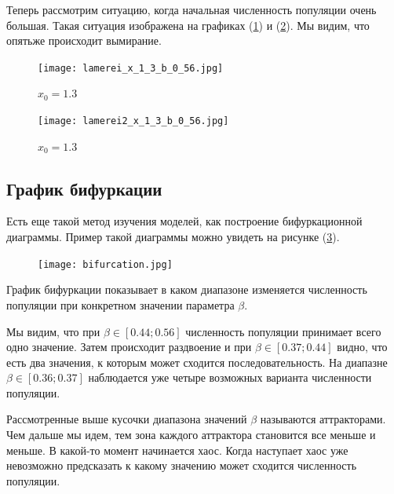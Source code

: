         Теперь рассмотрим ситуацию, когда начальная численность популяции очень большая. Такая ситуация изображена на графиках (\ref{lamerei_x_1_3_b_0_56}) и (\ref{lamerei2_x_1_3_b_0_56}). Мы видим, что опятьже происходит вымирание.
            
        \begin{figure}
            \centering
            \texttt{[image: lamerei\_x\_1\_3\_b\_0\_56.jpg]}
    
            \captionsetup{justification=centering}
            \caption{\(x_0 = 1.3\)}
            \label{lamerei_x_1_3_b_0_56}
        \end{figure}
            
        \begin{figure}
            \centering
            \texttt{[image: lamerei2\_x\_1\_3\_b\_0\_56.jpg]}
    
            \captionsetup{justification=centering}
            \caption{\(x_0 = 1.3\)}
            \label{lamerei2_x_1_3_b_0_56}
        \end{figure}

    \subsection{График бифуркации}

        Есть еще такой метод изучения моделей, как построение бифуркационной диаграммы. Пример такой диаграммы можно увидеть на рисунке (\ref{bifurcation}).

        \begin{figure}
            \centering
            \texttt{[image: bifurcation.jpg]}

            \captionsetup{justification=centering}
            \caption{}
            \label{bifurcation}
        \end{figure}

        График бифуркации показывает в каком диапазоне изменяется численность популяции при конкретном значении параметра \(\beta\).

        Мы видим, что при \(\beta \in [0.44; 0.56]\) численность популяции принимает всего одно значение. Затем происходит раздвоение и при \(\beta \in [0.37; 0.44]\) видно, что есть два значения, к которым может сходится последовательность. На диапазне \(\beta \in [0.36; 0.37]\) наблюдается уже четыре возможных варианта численности популяции. 
        
        Рассмотренные выше кусочки диапазона значений \(\beta\) называются аттракторами. Чем дальше мы идем, тем зона каждого аттрактора становится все меньше и меньше. В какой-то момент начинается хаос. Когда наступает хаос уже невозможно предсказать к какому значению может сходится численность популяции.

